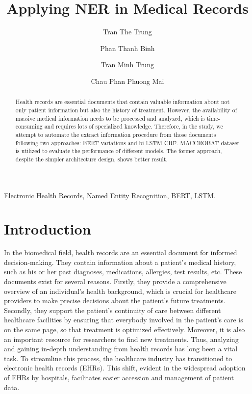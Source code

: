 \documentclass[conference]{IEEEtran}
\begin{document}
\title{Applying NER in Medical Records}
\author{Tran The Trung}
\author{Phan Thanh Binh}
\author{Tran Minh Trung}
\author{Chau Phan Phuong Mai}

\maketitle
\thispagestyle{fancy}

\begin{abstract}
Health records are essential documents that contain valuable information about not only patient
information but also the history of treatment. However, the availability of massive medical
information needs to be processed and analyzed, which is time-consuming and requires lots of
specialized knowledge. Therefore, in the study, we attempt to automate the extract
information procedure from those documents following two approaches: BERT variations and bi-LSTM-CRF. MACCROBAT dataset is utilized to evaluate the performance of different models. The former approach, despite the simpler architecture design, shows better result.
\end{abstract}

\begin{IEEEkeywords}
Electronic Health Records, Named Entity Recognition, BERT, LSTM.
\end{IEEEkeywords}

\section{Introduction}  \label{section1}
In the biomedical field, health records are an essential document for informed
decision-making. They contain information about a patient's medical history, such as
his or her past diagnoses, medications, allergies, test results, etc. These documents
exist for several reasons. Firstly, they provide a comprehensive overview of an
individual's health background, which is crucial for healthcare providers to make
precise decisions about the patient's future treatments. Secondly, they support the 
patient's continuity of care between different healthcare facilities by ensuring that 
everybody involved in the patient's care is on the same page, so that treatment is optimized 
effectively. Moreover, it is also an important resource for researchers to find new treatments. 
Thus, analyzing and gaining in-depth understanding from health records has long been a vital task. 
To streamline this process, the healthcare industry has transitioned to electronic health 
records (EHRs). This shift, evident 
in the widespread adoption of EHRs by hospitals, facilitates easier accession and management 
of patient data.
\end{document}
